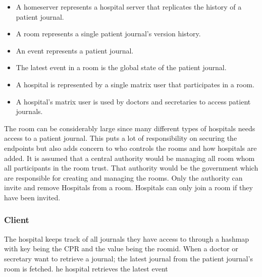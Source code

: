 \begin{itemize}
	\item A homeserver represents a hospital server that replicates the history of a patient journal. 
	\item A room represents a single patient journal's version history.
	\item An event represents a patient journal.  
	\item The latest event in a room is the global state of the patient journal.
	\item A hospital is represented by a single matrix user that participates in a room.
	\item A hospital's matrix user is used by doctors and secretaries to access patient journals. 
\end{itemize}


The room can be considerably large since many different types of hospitals needs access to a patient journal. This puts a lot of responsibility on securing the endpoints but also adds concern to who controls the rooms and how hospitals are added. It is assumed that a central authority would be managing all room whom all participants in the room trust. That authority would be the government which are responsible for creating and managing the rooms. Only the authority can invite and remove Hospitals from a room. Hospitals can only join a room if they have been invited.


\subsubsection{Client}



 The hospital keeps track of all journals they have access to through a hashmap with key being the CPR and the value being the roomid. When a doctor or secretary want to retrieve a journal; the latest journal from the patient journal's room is fetched.
 he hospital retrieves the latest event 
 
